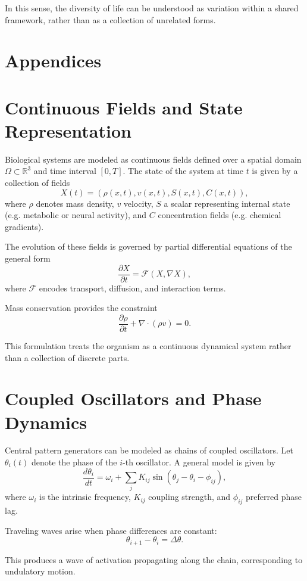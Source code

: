 \documentclass[11pt,oneside]{book}
\begin{document}
In this sense, the diversity of life can be understood as variation within a shared framework, rather than as a collection of unrelated forms.

\newpage
\section*{Appendices}

\appendix

\section{Continuous Fields and State Representation}

Biological systems are modeled as continuous fields defined over a spatial domain $\Omega \subset \mathbb{R}^3$ and time interval $[0,T]$. The state of the system at time $t$ is given by a collection of fields
\[
X(t) = (\rho(x,t), v(x,t), S(x,t), C(x,t)),
\]
where $\rho$ denotes mass density, $v$ velocity, $S$ a scalar representing internal state (e.g. metabolic or neural activity), and $C$ concentration fields (e.g. chemical gradients).

The evolution of these fields is governed by partial differential equations of the general form
\[
\frac{\partial X}{\partial t} = \mathcal{F}(X, \nabla X),
\]
where $\mathcal{F}$ encodes transport, diffusion, and interaction terms.

Mass conservation provides the constraint
\[
\frac{\partial \rho}{\partial t} + \nabla \cdot (\rho v) = 0.
\]

This formulation treats the organism as a continuous dynamical system rather than a collection of discrete parts.

\section{Coupled Oscillators and Phase Dynamics}

Central pattern generators can be modeled as chains of coupled oscillators. Let $\theta_i(t)$ denote the phase of the $i$-th oscillator. A general model is given by
\[
\frac{d\theta_i}{dt} = \omega_i + \sum_{j} K_{ij} \sin(\theta_j - \theta_i - \phi_{ij}),
\]
where $\omega_i$ is the intrinsic frequency, $K_{ij}$ coupling strength, and $\phi_{ij}$ preferred phase lag.

Traveling waves arise when phase differences are constant:
\[
\theta_{i+1} - \theta_i = \Delta \theta.
\]

This produces a wave of activation propagating along the chain, corresponding to undulatory motion.
\end{document}
